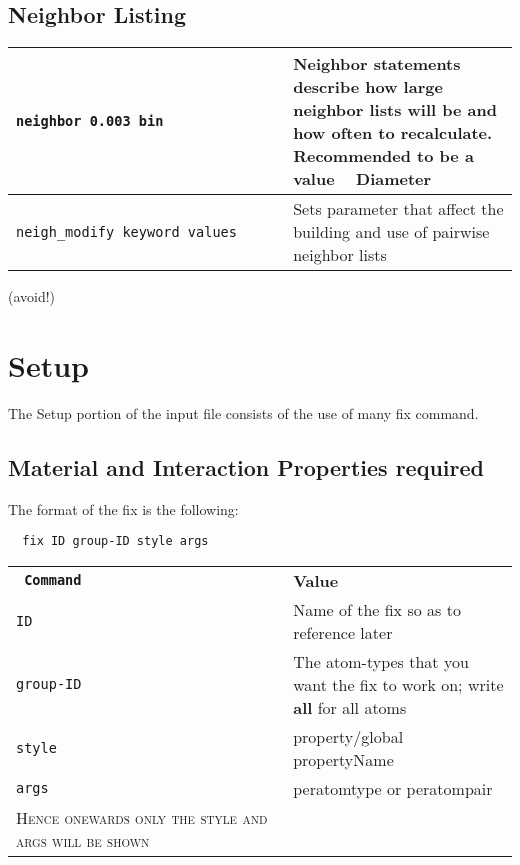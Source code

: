 \message{ !name(Cheatsheet.tex)}\documentclass[8pt]{extarticle} %
\begin{document}
\begin{multicols}{3}
  \vspace*{1ex}
  \subsection{Neighbor Listing}
  \begin{tabular}{L{0.55\linewidth} L{0.45\linewidth}}
    \tt neighbor 0.003 bin                  & Neighbor statements describe how large neighbor lists will be and how often to recalculate. Recommended to be a value ~ Diameter \\
    \hline
  \tt neigh\_modify keyword values & Sets parameter that affect the building and use of pairwise neighbor lists \\
  \end{tabular}
  \vspace*{-10pt}\hspace{2cm} (avoid!)


  \section{Setup}
  The Setup portion of the input file consists of the use of many fix command.

\subsection{Material and Interaction Properties required}
The format of the fix is the following:
\begin{verbatim}
  fix ID group-ID style args
  \end{verbatim}
  \begin{tabular}{L{0.55\linewidth} L{0.45\linewidth}}
    \tt\textbf{ Command} &  \textbf{Value} \\
    \tt ID             & Name of the fix so as to reference later                \\
    \hline
    \tt group-ID     & The atom-types that you want the fix to work on; write \textbf{all} for all atoms          \\
    \hline
    \tt style  & property/global propertyName \\
    \hline
    \tt args & peratomtype or peratompair \\
    \vspace*{1ex}
      \vspace*{1ex}

    \textsc{Hence onewards only the style and args will be shown}

  \end{tabular}
  \vspace*{1ex}


\end{multicols}
\end{document}
